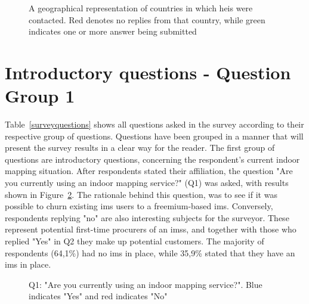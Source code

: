 \begin{figure}
    \centering
    \caption{A geographical representation of countries in which \glspl{hei} were contacted. Red denotes no replies from that country, while green indicates one or more answer being submitted}
    \label{fig:worldmap}
\end{figure}

\section{Introductory questions - Question Group 1}
Table~\ref{surveyquestions} shows all questions asked in the survey according to their respective group of questions. Questions have been grouped in a manner that will present the survey results in a clear way for the reader. The first group of questions are introductory questions, concerning the respondent's current indoor mapping situation. After respondents stated their affiliation, the question "Are you currently using an indoor mapping service?" (Q1) was asked, with results shown in Figure~\ref{fig:q1}. The rationale behind this question, was to see if it was possible to churn existing \gls{ims} users to a freemium-based \gls{ims}. Conversely, respondents replying "no" are also interesting subjects for the surveyor. These represent potential first-time procurers of an \glspl{ims}, and together with those who replied "Yes" in Q2 they make up potential customers. The majority of respondents (64,1\%) had no \gls{ims} in place, while 35,9\% stated that they have an \gls{ims} in place. 

\begin{figure}[H]
    \centering
    \caption{Q1: "Are you currently using an indoor mapping service?". Blue indicates "Yes" and red indicates "No"}
    \label{fig:q1}
\end{figure}



